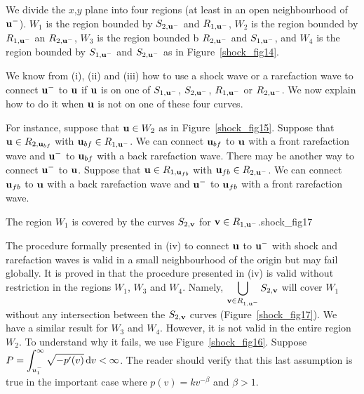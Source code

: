\begin{egg}

 We divide the $x$,$y$ plane into four regions (at least in
an open neighbourhood of $\displaystyle \mathbf{u}^-$).  $W_1$ is the
region bounded by  $S_{2,\mathbf{u}^-}$ and $R_{1,\mathbf{u}^-}$, $W_2$ is
the region bounded
by $R_{1,\mathbf{u}^-}$ an $R_{2,\mathbf{u}^-}$, $W_3$ is the region bounded
b $R_{2,\mathbf{u}^-}$ and $S_{1,\mathbf{u}^-}$, and $W_4$ is the region
bounded by $S_{1,\mathbf{u}^-}$ and $S_{2,\mathbf{u}^-}$ as in
Figure~\ref{shock_fig14}.

We know from (i), (ii) and (iii) how to use a shock wave or a
rarefaction wave to connect $\displaystyle \mathbf{u}^-$ to $\mathbf{u}$
if $\mathbf{u}$ is on one of $S_{1,\mathbf{u}^-}$, $S_{2,\mathbf{u}^-}$,
$R_{1,\mathbf{u}^-}$ or $R_{2,\mathbf{u}^-}$.  We now explain how to do it
when $\mathbf{u}$ is not on one of these four curves.

For instance, suppose that $\mathbf{u} \in W_2$ as in
Figure~\ref{shock_fig15}.  Suppose that
$\mathbf{u} \in R_{2,\mathbf{u}_{bf}}$ with $\mathbf{u}_{bf} \in R_{1,\mathbf{u}^-}$.
We can connect $\mathbf{u}_{bf}$ to $\mathbf{u}$ with a front rarefaction wave and
$\displaystyle \mathbf{u}^-$ to $\mathbf{u}_{bf}$ with a back rarefaction wave.
There may be another way to connect $\displaystyle \mathbf{u}^-$ to $\mathbf{u}$.
Suppose that $\mathbf{u} \in R_{1,\mathbf{u}_{fb}}$ with
$\mathbf{u}_{fb} \in R_{2,\mathbf{u}^-}$.  We can
connect $\mathbf{u}_{fb}$ to $\mathbf{u}$ with a back rarefaction wave and
$\displaystyle \mathbf{u}^-$ to $\mathbf{u}_{fb}$ with a front rarefaction wave.


{The region $W_1$ is covered by the curves $S_{2,\mathbf{v}}$ for
$\mathbf{v} \in R_{1,\mathbf{u}^-}$.}{shock_fig17}

 The procedure formally presented in (iv) to connect
$\mathbf{u}$ to $\displaystyle \mathbf{u}^-$ with shock and rarefaction
waves is valid in a small neighbourhood of the origin but may fail
globally.  It is proved in \cite{Smo} that the procedure presented in
(iv) is valid without restriction in the regions $W_1$, $W_3$ and $W_4$.
Namely, $\displaystyle \bigcup_{\mathbf{v}\in R_{1,\mathbf{u}^-}} S_{2,\mathbf{v}}$
will cover $W_1$ without any intersection between the $S_{2,\mathbf{v}}$
curves (Figure~\ref{shock_fig17}).  We have a similar result for $W_3$
and $W_4$.  However, it is not valid in the entire region $W_2$.  To
understand why it fails, we use Figure~\ref{shock_fig16}.
Suppose $\displaystyle P = \int_{u_1^-}^\infty \sqrt{-p'(v)}\,\mathrm{d}{v} < \infty$.
The reader should verify that this last assumption is true in the
important case where $\displaystyle p(v) = kv^{-\beta}$ and $\beta >1$.


\end{egg}
